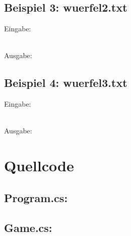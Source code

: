 \documentclass[a4paper,11pt,ngerman]{scrartcl}
\begin{document}
\subsection{Beispiel 3: wuerfel2.txt}
Eingabe:
\begin{tcolorbox}[center,width=12cm,title=Textfiles/wuerfel2.txt]
	\centering
	
\end{tcolorbox}
\\ Ausgabe:
\centering
\begin{tcolorbox}[center,width=12cm,title=Textfiles/wuerfel2\_result.txt]
	
	
\end{tcolorbox}
\subsection{Beispiel 4: wuerfel3.txt}
Eingabe:
\begin{tcolorbox}[center,width=12cm,title=Textfiles/wuerfel3.txt]
	\centering
	
\end{tcolorbox}
\\ Ausgabe:
\centering
\begin{tcolorbox}[center,width=16cm,title=Textfiles/wuerfel3\_result.txt]
	
	
\end{tcolorbox}

\section{Quellcode}
\subsection{Program.cs:}

\subsection{Game.cs:}

\end{document}
